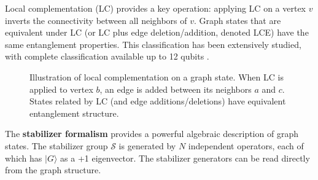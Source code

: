 \documentclass[12pt,a4paper]{article}
\begin{document}
Local complementation (LC) provides a key operation: applying LC on a vertex $v$ inverts the connectivity between all neighbors of $v$. Graph states that are equivalent under LC (or LC plus edge deletion/addition, denoted LCE) have the same entanglement properties. This classification has been extensively studied, with complete classification available up to 12 qubits \cite{hein2004entanglement,danielsen2008graph}.

\begin{figure}[htbp]
	\centering
	\caption{Illustration of local complementation on a graph state. When LC is applied to vertex $b$, an edge is added between its neighbors $a$ and $c$. States related by LC (and edge additions/deletions) have equivalent entanglement structure.}
	\label{fig:local-complementation}
\end{figure}

The \textbf{stabilizer formalism} provides a powerful algebraic description of graph states. The stabilizer group $\mathcal{S}$ is generated by $N$ independent operators, each of which has $|G\rangle$ as a +1 eigenvector. The stabilizer generators can be read directly from the graph structure.
\end{document}
